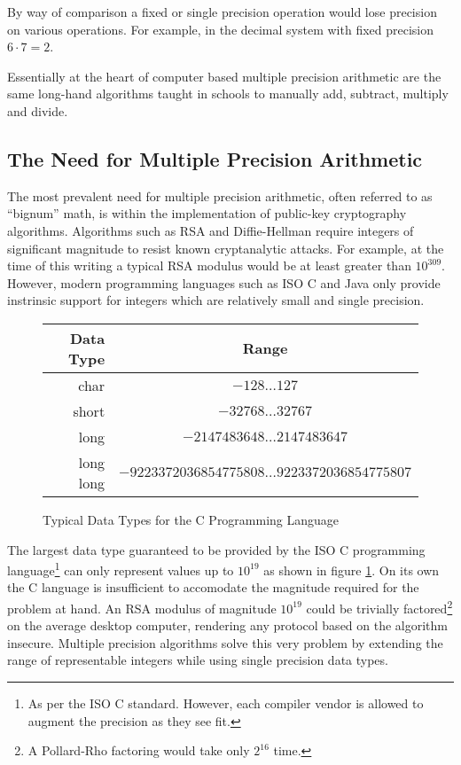 \documentclass[b5paper]{book}
\begin{document}
By way of comparison a fixed or single precision operation would lose precision on various operations.  For example, in
the decimal system with fixed precision $6 \cdot 7 = 2$.

Essentially at the heart of computer based multiple precision arithmetic are the same long-hand algorithms taught in
schools to manually add, subtract, multiply and divide.  

\subsection{The Need for Multiple Precision Arithmetic}
The most prevalent need for multiple precision arithmetic, often referred to as ``bignum'' math, is within the implementation
of public-key cryptography algorithms.   Algorithms such as RSA \cite{RSAREF} and Diffie-Hellman \cite{DHREF} require 
integers of significant magnitude to resist known cryptanalytic attacks.  For example, at the time of this writing a 
typical RSA modulus would be at least greater than $10^{309}$.  However, modern programming languages such as ISO C \cite{ISOC} and 
Java \cite{JAVA} only provide instrinsic support for integers which are relatively small and single precision.

\begin{figure}[!here]
\begin{center}
\begin{tabular}{|r|c|}
\hline \textbf{Data Type} & \textbf{Range} \\
\hline char  & $-128 \ldots 127$ \\
\hline short & $-32768 \ldots 32767$ \\
\hline long  & $-2147483648 \ldots 2147483647$ \\
\hline long long & $-9223372036854775808 \ldots 9223372036854775807$ \\
\hline
\end{tabular}
\end{center}
\caption{Typical Data Types for the C Programming Language}
\label{fig:ISOC}
\end{figure}

The largest data type guaranteed to be provided by the ISO C programming 
language\footnote{As per the ISO C standard.  However, each compiler vendor is allowed to augment the precision as they 
see fit.}  can only represent values up to $10^{19}$ as shown in figure \ref{fig:ISOC}. On its own the C language is 
insufficient to accomodate the magnitude required for the problem at hand.  An RSA modulus of magnitude $10^{19}$ could be 
trivially factored\footnote{A Pollard-Rho factoring would take only $2^{16}$ time.} on the average desktop computer, 
rendering any protocol based on the algorithm insecure.  Multiple precision algorithms solve this very problem by 
extending the range of representable integers while using single precision data types.
\end{document}
